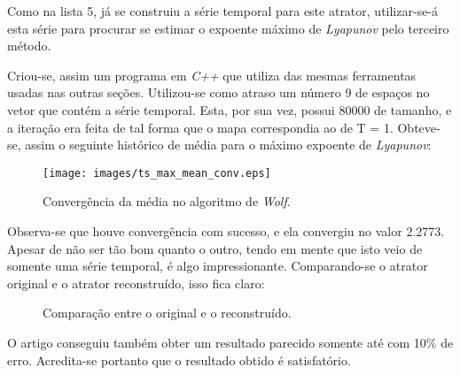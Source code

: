 \documentclass{article}[twocolumn]
\begin{document}
	Como na lista 5, j\'a se construiu a s\'erie temporal para este atrator, utilizar-se-\'a
	esta s\'erie para procurar se estimar o expoente m\'aximo de \textit{Lyapunov} pelo
	terceiro m\'etodo.

	Criou-se, assim um programa em \textit{C++} que utiliza das mesmas ferramentas usadas nas
	outras se\c{c}\~oes. Utilizou-se como atraso um n\'umero 9 de espa\c{c}os no vetor que cont\'em
	a s\'erie temporal. Esta, por sua vez, possui 80000 de tamanho, e a itera\c{c}\~ao era feita
	de tal forma que o mapa correspondia ao de T = 1. Obteve-se, assim o seguinte hist\'orico de
	m\'edia para o m\'aximo expoente de \textit{Lyapunov}:
	\begin{figure}[H]
		\centering
		\texttt{[image: images/ts\_max\_mean\_conv.eps]}
		\caption{Converg\^encia da m\'edia no algoritmo de \textit{Wolf}.}
	\end{figure}
	Observa-se que houve converg\^encia com sucesso, e ela convergiu no valor 2.2773. Apesar
	de n\~ao ser t\~ao bom quanto o outro, tendo em mente que isto veio de somente uma s\'erie
	temporal, \'e algo impressionante. Comparando-se o atrator original e o atrator
	reconstru\'ido, isso fica claro:
	\begin{figure}[H]
		\centering
		\caption{Compara\c{c}\~ao entre o original e o reconstru\'ido.}
	\end{figure}
	O artigo conseguiu tamb\'em obter um resultado parecido somente at\'e com 10\% de erro.
	Acredita-se portanto que o resultado obtido \'e satisfat\'orio.
\end{document}
